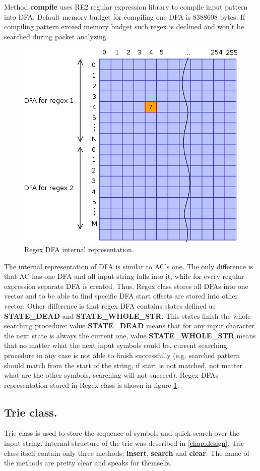 \documentclass[thesis=M,english]{FITthesis}[2011/07/15]
\begin{document}
Method \textbf{compile} uses RE2 regular expression library to compile input pattern into DFA. Default memory budget for compiling one DFA is 8388608 bytes. If compiling pattern exceed memory budget such regex is declined and won't be searched during packet analyzing.

\begin{figure}[h]
\centering
\includegraphics[scale=0.5]{images/regex_grid.png}
\caption{Regex DFA internal representation.}
\label{fig:regex_grid}
\end{figure}

The internal representation of DFA is similar to AC's one. The only difference is that AC has one DFA and all input string falls into it, while for every regular expression separate DFA is created. Thus, Regex class stores all DFAs into one vector and to be able to find specific DFA start offsets are stored into other vector. Other difference is that regex DFA contains states defined as \textbf{STATE\_DEAD} and \textbf{STATE\_WHOLE\_STR}. This states finish the whole searching procedure: value \textbf{STATE\_DEAD} means that for any input character the next state is always the current one, value \textbf{STATE\_WHOLE\_STR} means that no matter what the next input symbols could be, current searching procedure in any case is not able to finish successfully (e.g. searched pattern should match from the start of the string, if start is not matched, not matter what are the other symbols, searching will not succeed).
Regex DFAs representation stored in Regex class is shown in figure \ref{fig:regex_grid}.

\subsection{Trie class.}
Trie class is used to store the sequence of symbols and quick search over the input string. Internal structure of the trie was described in \ref{chap:design}. Trie class itself contain only three methods: \textbf{insert}, \textbf{search} and \textbf{clear}. The name of the methods are pretty clear and speaks for themselfs.
\end{document}
